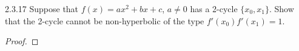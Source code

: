\begin{problem}{2.3.17}
  Suppose that $f(x) = ax^2 + bx + c$, $a\neq 0$ has a 2-cycle $\{x_0, x_1\}$.
  Show that the 2-cycle cannot be non-hyperbolic of the type $f'(x_0)f'(x_1) = 1$.

\end{problem}

\begin{proof}
\end{proof}
\newpage
